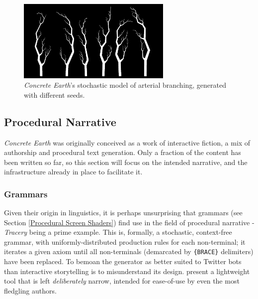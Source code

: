 \documentclass[a4paper, 11pt]{article}
\begin{document}
\begin{flushleft}
\begin{figure}[h]
\centering
\includegraphics[width=0.66\textwidth]{Blood Vessels}
\caption{\textit{Concrete Earth}'s stochastic model of arterial branching, generated with different seeds.}
\label{Blood Vessels}
\end{figure}


\subsection{Procedural Narrative} %

\textit{Concrete Earth} was originally conceived as a work of interactive fiction, a mix of authorship and procedural text generation. Only a fraction of the content has been written so far, so this section will focus on the intended narrative, and the infrastructure already in place to facilitate it. 

\subsubsection{Grammars}

Given their origin in linguistics, it is perhaps unsurprising that grammars (see Section \ref{Procedural Screen Shaders}) find use in the field of procedural narrative - \textit{Tracery} \citep{comptonTracery} being a prime example. This is, formally, a stochastic, context-free grammar, with uniformly-distributed production rules for each non-terminal; it iterates a given axiom until all non-terminals (demarcated by \texttt{\{BRACE\}} delimiters) have been replaced. To bemoan the generator as better suited to Twitter bots than interactive storytelling is to misunderstand its design. \citeauthor{comptonTracery} present a lightweight tool that is left \textit{deliberately} narrow, intended for ease-of-use by even the most fledgling authors.


\end{flushleft}
\end{document}
